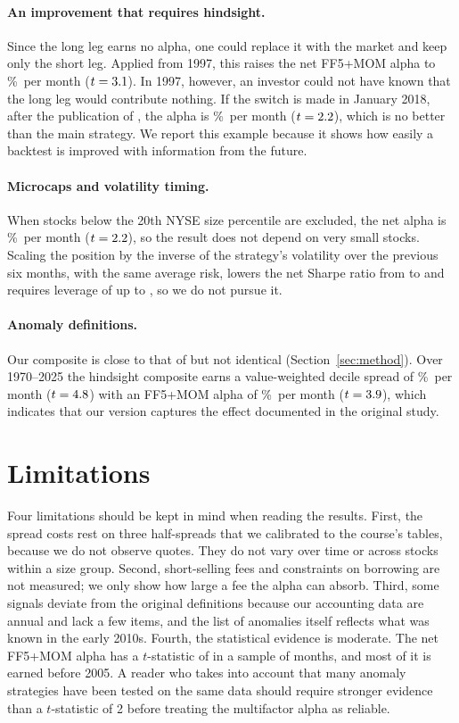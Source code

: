 \documentclass[12pt,a4paper]{article}
\newcommand{\pmo}{\%~per month}
\begin{document}
\paragraph{An improvement that requires hindsight.} Since the long leg earns no alpha, one could replace it with the market and keep only the short leg. Applied from 1997, this raises the net FF5+MOM alpha to \hedgeall\pmo{} ($t=3.1$). In 1997, however, an investor could not have known that the long leg would contribute nothing. If the switch is made in January 2018, after the publication of \citet{stambaugh2017}, the alpha is \hedgert\pmo{} ($t=2.2$), which is no better than the main strategy. We report this example because it shows how easily a backtest is improved with information from the future.

\paragraph{Microcaps and volatility timing.} When stocks below the 20th NYSE size percentile are excluded, the net alpha is \robexmicro\pmo{} ($t=2.2$), so the result does not depend on very small stocks. Scaling the position by the inverse of the strategy's volatility over the previous six months, with the same average risk, lowers the net Sharpe ratio from \vsrorig{} to \vsrscaled{} and requires leverage of up to \vlevmax, so we do not pursue it.

\paragraph{Anomaly definitions.} Our composite is close to that of \citet{stambaugh2017} but not identical (Section~\ref{sec:method}). Over 1970--2025 the hindsight composite earns a value-weighted decile spread of \insmean\pmo{} ($t=4.8$) with an FF5+MOM alpha of \insa\pmo{} ($t=3.9$), which indicates that our version captures the effect documented in the original study.

\section{Limitations}\label{sec:limits}

Four limitations should be kept in mind when reading the results. First, the spread costs rest on three half-spreads that we calibrated to the course's tables, because we do not observe quotes. They do not vary over time or across stocks within a size group. Second, short-selling fees and constraints on borrowing are not measured; we only show how large a fee the alpha can absorb. Third, some signals deviate from the original definitions because our accounting data are annual and lack a few items, and the list of anomalies itself reflects what was known in the early 2010s. Fourth, the statistical evidence is moderate. The net FF5+MOM alpha has a $t$-statistic of \netfullat{} in a sample of \nmonths{} months, and most of it is earned before 2005. A reader who takes into account that many anomaly strategies have been tested on the same data should require stronger evidence than a $t$-statistic of 2 before treating the multifactor alpha as reliable.
\end{document}

